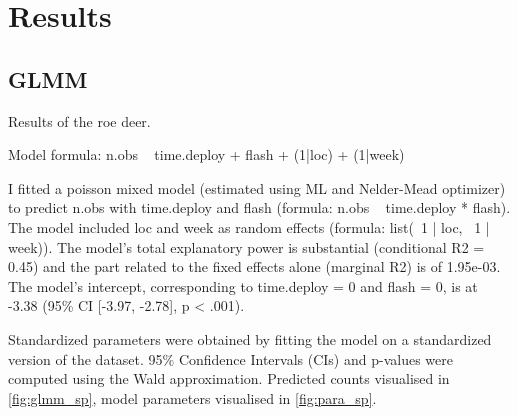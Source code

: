 \section{Results}
%
%
%



\subsection{GLMM}
Results of the roe deer.

Model formula: n.obs ~ time.deploy + flash + (1|loc) + (1|week)

I fitted a poisson mixed model (estimated using ML and Nelder-Mead optimizer) to predict n.obs with time.deploy and flash (formula: n.obs ~ time.deploy * flash).
The model included loc and week as random effects (formula: list(~1 | loc, ~1 | week)).
The model's total explanatory power is substantial (conditional R2 = 0.45) and the part related to the fixed effects alone (marginal R2) is of 1.95e-03.
The model's intercept, corresponding to time.deploy = 0 and flash = 0, is at -3.38 (95\% CI [-3.97, -2.78], p < .001).


Standardized parameters were obtained by fitting the model on a standardized version of the dataset. 95\% Confidence Intervals (CIs) and p-values were computed using the Wald approximation. Predicted counts visualised in \vref{fig:glmm_sp}, model parameters visualised in \vref{fig:para_sp}.


